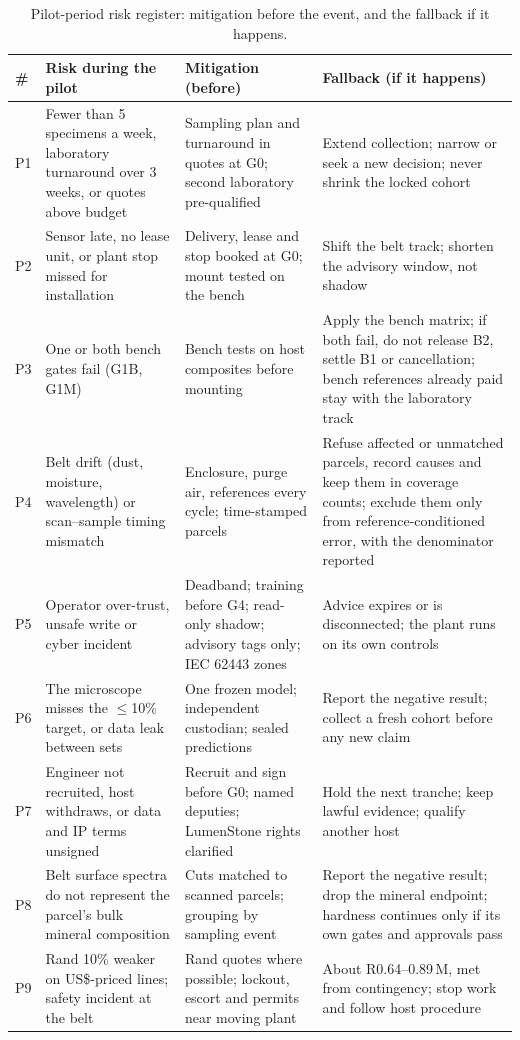 \documentclass[10pt,a4paper,twocolumn]{article}
\begin{document}
\begin{table}[t]
\centering\footnotesize
\caption{Pilot-period risk register: mitigation before the event, and the fallback if it happens.}
\label{tab:risks}
\begin{tabularx}{\textwidth}{@{}L{0.45cm}L{4.6cm}YY@{}}
\toprule
\# & Risk during the pilot & Mitigation (before) & Fallback (if it happens) \\
\midrule
P1 & Fewer than 5 specimens a week, laboratory turnaround over 3 weeks, or quotes above budget & Sampling plan and turnaround in quotes at G0; second laboratory pre-qualified & Extend collection; narrow or seek a new decision; never shrink the locked cohort \\
P2 & Sensor late, no lease unit, or plant stop missed for installation & Delivery, lease and stop booked at G0; mount tested on the bench & Shift the belt track; shorten the advisory window, not shadow \\
P3 & One or both bench gates fail (G1B, G1M) & Bench tests on host composites before mounting & Apply the bench matrix; if both fail, do not release B2, settle B1 or cancellation; bench references already paid stay with the laboratory track \\
P4 & Belt drift (dust, moisture, wavelength) or scan--sample timing mismatch & Enclosure, purge air, references every cycle; time-stamped parcels & Refuse affected or unmatched parcels, record causes and keep them in coverage counts; exclude them only from reference-conditioned error, with the denominator reported \\
P5 & Operator over-trust, unsafe write or cyber incident & Deadband; training before G4; read-only shadow; advisory tags only; IEC 62443 zones \cite{iec62443} & Advice expires or is disconnected; the plant runs on its own controls \\
P6 & The microscope misses the $\leq$10\% target, or data leak between sets & One frozen model; independent custodian; sealed predictions & Report the negative result; collect a fresh cohort before any new claim \\
P7 & Engineer not recruited, host withdraws, or data and IP terms unsigned & Recruit and sign before G0; named deputies; LumenStone rights clarified & Hold the next tranche; keep lawful evidence; qualify another host \\
P8 & Belt surface spectra do not represent the parcel's bulk mineral composition & Cuts matched to scanned parcels; grouping by sampling event & Report the negative result; drop the mineral endpoint; hardness continues only if its own gates and approvals pass \\
P9 & Rand 10\% weaker on US\$-priced lines; safety incident at the belt & Rand quotes where possible; lockout, escort and permits near moving plant & About R0.64--0.89\,M, met from contingency; stop work and follow host procedure \\
\bottomrule
\end{tabularx}
\end{table}
\end{document}
